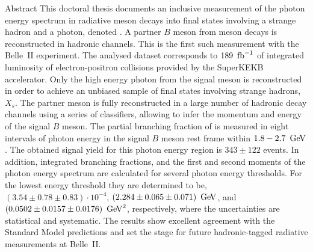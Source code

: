 \begin{abstractpage}{Abstract}
    This doctoral thesis documents an inclusive measurement of the photon energy spectrum in radiative \B meson decays 
    into final states involving a strange hadron and a photon, denoted \BtoXsgamma. 
    A partner $B$ meson from \FourS meson decays is reconstructed in hadronic channels.
    This is the first such measurement with the Belle~II experiment.
    The analysed dataset corresponds to $189~\mbox{\,fb}^{-1}$ of integrated luminosity of electron-positron collisions provided by the SuperKEKB accelerator.
    Only the high energy photon from the signal \B meson is reconstructed in order to achieve an unbiased sample of final states involving strange hadrons, $X_s$.
    The partner \B meson is fully reconstructed in a large number of hadronic decay channels using a series of classifiers,
    allowing to infer the momentum and energy of the signal $B$ meson.
    The partial branching fraction of \BtoXsgamma is measured  in eight intervals of photon energy 
    in the signal $B$ meson rest frame within $1.8-2.7~\mathrm{\,Ge\kern -0.1em V}$.
    The obtained signal yield for this photon energy region is $343 \pm 122$ events. 
    In addition, integrated branching fractions, and the first and second moments of the photon energy spectrum are calculated for several photon energy thresholds.
    For the lowest energy threshold they are determined to be, 
    $(3.54 \pm 0.78 \pm 0.83)\cdot10^{-4}$,
    $(2.284 \pm 0.065 \pm 0.071)~\mathrm{\,Ge\kern -0.1em V}$,
    and $(0.0502 \pm 0.0157 \pm 0.0176)~\mathrm{\,Ge\kern -0.1em V}^2$,
    respectively, where the uncertainties are statistical and systematic.
    The results show excellent agreement with the Standard Model predictions and set the stage for future hadronic-tagged radiative measurements at Belle~II.
    \end{abstractpage}
